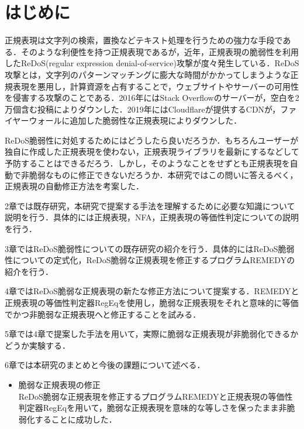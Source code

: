 \documentclass[a4paper, 12pt, dvipdfmx, uplatex]{jsreport}
\begin{document}
\chapter{はじめに}
正規表現は文字列の検索，置換などテキスト処理を行うための強力な手段である．そのような利便性を持つ正規表現であるが，近年，正規表現の脆弱性を利用したReDoS(regular expression denial-of-service)攻撃が度々発生している．ReDoS攻撃とは，文字列のパターンマッチングに膨大な時間がかかってしまうような正規表現を悪用し，計算資源を占有することで，ウェブサイトやサーバーの可用性を侵害する攻撃のことである．2016年にはStack Overflowのサーバーが，空白を2万個含む投稿によりダウンした\cite{stackoverflow}．2019年にはCloudflareが提供するCDNが，ファイヤーウォールに追加した脆弱性な正規表現によりダウンした\cite{cloudflare}．


ReDoS脆弱性に対処するためにはどうしたら良いだろうか．もちろんユーザーが独自に作成した正規表現を使わない，正規表現ライブラリを最新にするなどして予防することはできるだろう．しかし，そのようなことをせずとも正規表現を自動で非脆弱なものに修正できないだろうか．本研究ではこの問いに答えるべく，正規表現の自動修正方法を考案した．

2章では既存研究，本研究で提案する手法を理解するために必要な知識について説明を行う．具体的には正規表現，NFA，正規表現の等価性判定についての説明を行う．

3章ではReDoS脆弱性についての既存研究の紹介を行う．具体的にはReDoS脆弱性についての定式化，ReDoS脆弱な正規表現を修正するプログラムREMEDYの紹介を行う．

4章ではReDoS脆弱な正規表現の新たな修正方法について提案する．REMEDYと正規表現の等価性判定器RegEqを使用し，脆弱な正規表現をそれと意味的に等価でかつ非脆弱な正規表現へと修正することを試みる．

5章では4章で提案した手法を用いて，実際に脆弱な正規表現が非脆弱化できるかどうか実験する．

6章では本研究のまとめと今後の課題について述べる．

\begin{itemize}
  \item 脆弱な正規表現の修正\\
  ReDoS脆弱な正規表現を修正するプログラムREMEDYと正規表現の等価性判定器RegEqを用いて，脆弱な正規表現を意味的な等しさを保ったまま非脆弱化することに成功した．
\end{itemize}



% 
% 
\end{document}
